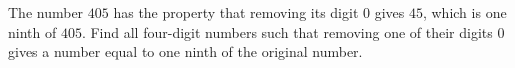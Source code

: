 The number $405$ has the property that removing its digit $0$ gives $45$, which is one ninth of $405$. Find all four-digit numbers such that removing one of their digits $0$ gives a number equal to one ninth of the original number.
